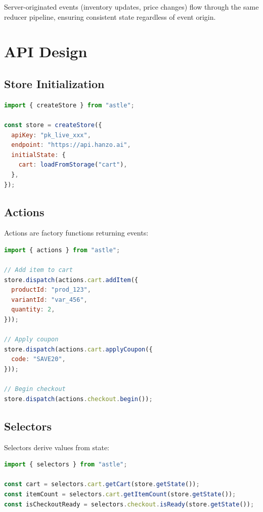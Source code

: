 \documentclass[11pt,twocolumn]{article}
\begin{document}
Server-originated events (inventory updates, price changes) flow through the same reducer pipeline, ensuring consistent state regardless of event origin.

\section{API Design}

\subsection{Store Initialization}

\begin{lstlisting}[language=JavaScript,caption=Store creation]
import { createStore } from "astle";

const store = createStore({
  apiKey: "pk_live_xxx",
  endpoint: "https://api.hanzo.ai",
  initialState: {
    cart: loadFromStorage("cart"),
  },
});
\end{lstlisting}

\subsection{Actions}

Actions are factory functions returning events:

\begin{lstlisting}[language=JavaScript,caption=Action creators]
import { actions } from "astle";

// Add item to cart
store.dispatch(actions.cart.addItem({
  productId: "prod_123",
  variantId: "var_456",
  quantity: 2,
}));

// Apply coupon
store.dispatch(actions.cart.applyCoupon({
  code: "SAVE20",
}));

// Begin checkout
store.dispatch(actions.checkout.begin());
\end{lstlisting}

\subsection{Selectors}

Selectors derive values from state:

\begin{lstlisting}[language=JavaScript,caption=Selectors]
import { selectors } from "astle";

const cart = selectors.cart.getCart(store.getState());
const itemCount = selectors.cart.getItemCount(store.getState());
const isCheckoutReady = selectors.checkout.isReady(store.getState());
\end{lstlisting}
\end{document}
